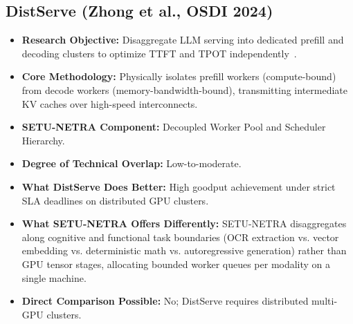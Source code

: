 \documentclass[11pt,a4paper]{article}
\begin{document}
\subsection{DistServe (Zhong et al., OSDI 2024)}
\begin{itemize}[leftmargin=*]
    \item \textbf{Research Objective:} Disaggregate LLM serving into dedicated prefill and decoding clusters to optimize TTFT and TPOT independently~\cite{Zhong2024DistServe}.
    \item \textbf{Core Methodology:} Physically isolates prefill workers (compute-bound) from decode workers (memory-bandwidth-bound), transmitting intermediate KV caches over high-speed interconnects.
    \item \textbf{SETU-NETRA Component:} Decoupled Worker Pool and Scheduler Hierarchy.
    \item \textbf{Degree of Technical Overlap:} Low-to-moderate.
    \item \textbf{What DistServe Does Better:} High goodput achievement under strict SLA deadlines on distributed GPU clusters.
    \item \textbf{What SETU-NETRA Offers Differently:} SETU-NETRA disaggregates along cognitive and functional task boundaries (OCR extraction vs. vector embedding vs. deterministic math vs. autoregressive generation) rather than GPU tensor stages, allocating bounded worker queues per modality on a single machine.
    \item \textbf{Direct Comparison Possible:} No; DistServe requires distributed multi-GPU clusters.
\end{itemize}

\end{document}

